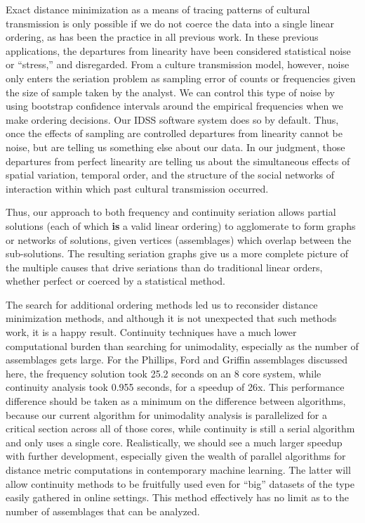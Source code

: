 Exact distance minimization as a means of tracing patterns of cultural
transmission is only possible if we do not coerce the data into a single
linear ordering, as has been the practice in all previous work. In these
previous applications, the departures from linearity have been
considered statistical noise or ``stress,'' and disregarded. From a
culture transmission model, however, noise only enters the seriation
problem as sampling error of counts or frequencies given the size of
sample taken by the analyst. We can control this type of noise by using
bootstrap confidence intervals around the empirical frequencies when we
make ordering decisions. Our IDSS software system does so by default.
Thus, once the effects of sampling are controlled departures from
linearity cannot be noise, but are telling us something else about our
data. In our judgment, those departures from perfect linearity are
telling us about the simultaneous effects of spatial variation, temporal
order, and the structure of the social networks of interaction within
which past cultural transmission occurred.

Thus, our approach to both frequency and continuity seriation allows
partial solutions (each of which \textbf{is} a valid linear ordering) to
agglomerate to form graphs or networks of solutions, given vertices
(assemblages) which overlap between the sub-solutions. The resulting
seriation graphs give us a more complete picture of the multiple causes
that drive seriations than do traditional linear orders, whether perfect
or coerced by a statistical method.

The search for additional ordering methods led us to reconsider distance
minimization methods, and although it is not unexpected that such
methods work, it is a happy result. Continuity techniques have a much
lower computational burden than searching for unimodality, especially as
the number of assemblages gets large. For the Phillips, Ford and Griffin
assemblages discussed here, the frequency solution took 25.2 seconds on
an 8 core system, while continuity analysis took 0.955 seconds, for a
speedup of 26x. This performance difference should be taken as a minimum
on the difference between algorithms, because our current algorithm for
unimodality analysis is parallelized for a critical section across all
of those cores, while continuity is still a serial algorithm and only
uses a single core. Realistically, we should see a much larger speedup
with further development, especially given the wealth of parallel
algorithms for distance metric computations in contemporary machine
learning. The latter will allow continuity methods to be fruitfully used
even for ``big'' datasets of the type easily gathered in online
settings. This method effectively has no limit as to the number of
assemblages that can be analyzed.

